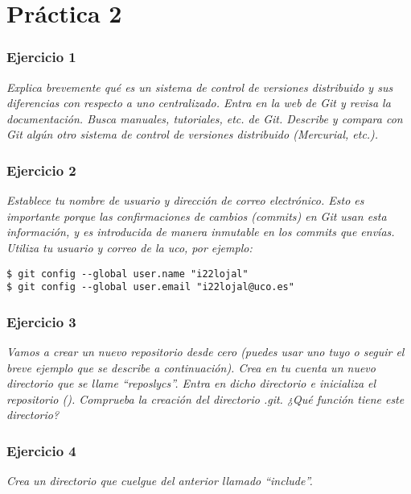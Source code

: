 \part{Práctica 2}
\section{Ejercicio 1}
\begin{center}
    \parbox{12cm}{\justify\textit{Explica brevemente qué es un sistema de control de versiones distribuido y sus diferencias con respecto a uno centralizado. Entra en la web de Git y revisa la documentación. Busca manuales, tutoriales, etc. de Git. Describe y compara con Git algún otro sistema de control de versiones distribuido (Mercurial, etc.).
    }}
\end{center}




\section{Ejercicio 2}
\begin{center}
    \parbox{12cm}{\justify\textit{
        Establece tu nombre de usuario y dirección de correo electrónico. Esto es importante porque las confirmaciones de cambios (commits) en Git usan esta información, y es introducida de manera inmutable en los commits que envías. Utiliza tu usuario y correo de la uco, por ejemplo:}}
    \end{center}


\begin{lstlisting}[xleftmargin=.16\textwidth]
$ git config --global user.name "i22lojal"
$ git config --global user.email "i22lojal@uco.es"
\end{lstlisting}


\section{Ejercicio 3}
\begin{center}
    \parbox{12cm}{\justify\textit{Vamos a crear un nuevo repositorio desde cero (puedes usar uno tuyo o seguir el breve ejemplo que se describe a continuación). Crea en tu cuenta un nuevo directorio que se llame “reposlycs”. Entra en dicho directorio e inicializa el repositorio (). Comprueba la creación del directorio .git. ¿Qué función tiene este directorio?
    }}
\end{center}


\section{Ejercicio 4}
\begin{center}
    \parbox{12cm}{\justify\textit{Crea un directorio que cuelgue del anterior llamado ``include''.
    }}
\end{center}

